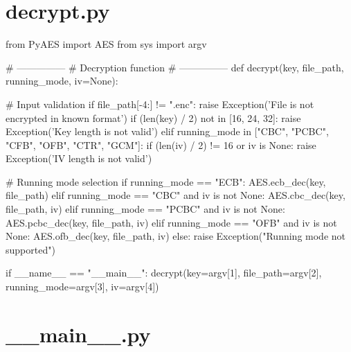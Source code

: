 \section{decrypt.py}
\label{app:decrypt.py}

\begin{python}
from PyAES import AES
from sys import argv


# ---------------
# Decryption function
# ---------------
def decrypt(key, file_path, running_mode, iv=None):

    # Input validation
    if file_path[-4:] != ".enc":
        raise Exception('File is not encrypted in known format')
    if (len(key) / 2) not in [16, 24, 32]:
        raise Exception('Key length is not valid')
    elif running_mode in ["CBC", "PCBC", "CFB", "OFB", "CTR", "GCM"]:
        if (len(iv) / 2) != 16 or iv is None:
            raise Exception('IV length is not valid')

    # Running mode selection
    if running_mode == "ECB":
        AES.ecb_dec(key, file_path)
    elif running_mode == "CBC" and iv is not None:
        AES.cbc_dec(key, file_path, iv)
    elif running_mode == "PCBC" and iv is not None:
        AES.pcbc_dec(key, file_path, iv)
    elif running_mode == "OFB" and iv is not None:
        AES.ofb_dec(key, file_path, iv)
    else:
        raise Exception("Running mode not supported")


if __name__ == "__main__":
    decrypt(key=argv[1], file_path=argv[2], running_mode=argv[3], iv=argv[4])

\end{python}

\section{\_\_main\_\_.py}
\label{app:__main__.py}

